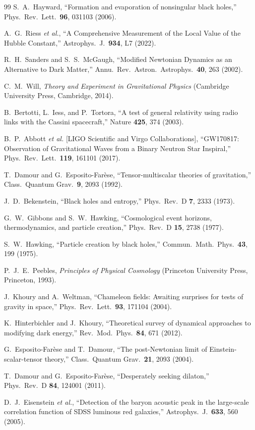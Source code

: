 \documentclass[prd,
               reprint,
               aps,
               preprintnumbers,
               nofootinbib,
               longbibliography,
               floatfix]{revtex4-2}
\begin{document}
\begin{thebibliography}{99}
S.~A.~Hayward,
``Formation and evaporation of nonsingular black holes,''
Phys.\ Rev.\ Lett.\ {\bf 96}, 031103 (2006).


A.~G.~Riess {\it et al.},
``A Comprehensive Measurement of the Local Value of the 
Hubble Constant,'' Astrophys.\ J.\ {\bf 934}, L7 (2022).


R.~H.~Sanders and S.~S.~McGaugh,
``Modified Newtonian Dynamics as an Alternative to Dark Matter,''
Annu.\ Rev.\ Astron.\ Astrophys.\ {\bf 40}, 263 (2002).

C.~M.~Will,
\emph{Theory and Experiment in Gravitational Physics}
(Cambridge University Press, Cambridge, 2014).

B.~Bertotti, L.~Iess, and P.~Tortora,
``A test of general relativity using radio links with the Cassini spacecraft,''
Nature {\bf 425}, 374 (2003).

B.~P.~Abbott {\it et al.} [LIGO Scientific and Virgo Collaborations],
``GW170817: Observation of Gravitational Waves from a Binary Neutron Star Inspiral,''
Phys.\ Rev.\ Lett.\ {\bf 119}, 161101 (2017).

T.~Damour and G.~Esposito-Far\`ese,
``Tensor-multiscalar theories of gravitation,''
Class.\ Quantum Grav.\ {\bf 9}, 2093 (1992).

J.~D.~Bekenstein,
``Black holes and entropy,''
Phys.\ Rev.\ D {\bf 7}, 2333 (1973).

G.~W.~Gibbons and S.~W.~Hawking,
``Cosmological event horizons, thermodynamics, and 
particle creation,'' Phys.\ Rev.\ D {\bf 15}, 2738 (1977).

S.~W.~Hawking,
``Particle creation by black holes,''
Commun.\ Math.\ Phys.\ {\bf 43}, 199 (1975).

P.~J.~E.~Peebles,
\emph{Principles of Physical Cosmology}
(Princeton University Press, Princeton, 1993).

J.~Khoury and A.~Weltman,
``Chameleon fields: Awaiting surprises for tests of 
gravity in space,'' Phys.\ Rev.\ Lett.\ {\bf 93}, 
171104 (2004).

K.~Hinterbichler and J.~Khoury,
``Theoretical survey of dynamical approaches to 
modifying dark energy,'' Rev.\ Mod.\ Phys.\ {\bf 84}, 
671 (2012).

G.~Esposito-Far\`ese and T.~Damour,
``The post-Newtonian limit of Einstein-scalar-tensor 
theory,'' Class.\ Quantum Grav.\ {\bf 21}, 2093 (2004).

T.~Damour and G.~Esposito-Far\`ese,
``Desperately seeking dilaton,''
Phys.\ Rev.\ D {\bf 84}, 124001 (2011).


D.~J.~Eisenstein {\it et al.},
``Detection of the baryon acoustic peak in the large-scale correlation function of SDSS luminous red galaxies,''
Astrophys.\ J.\ {\bf 633}, 560 (2005).

\end{thebibliography}
\end{document}
